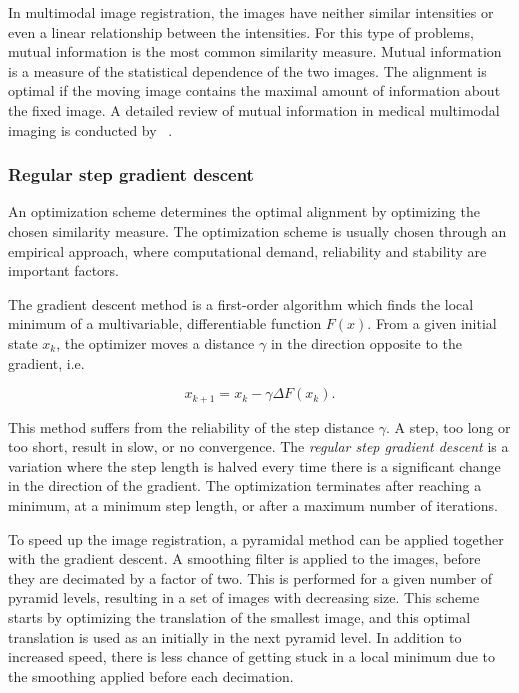 In multimodal image registration, the images have neither similar intensities or even a linear relationship between the intensities. For this type of problems, mutual information is the most common similarity measure. Mutual information is a measure of the statistical dependence of the two images. The alignment is optimal if the moving image contains the maximal amount of information about the fixed image. A detailed review of mutual information in medical multimodal imaging is conducted by ~\citet{563664}.  

\subsubsection{Regular step gradient descent}
An optimization scheme determines the optimal alignment by optimizing the chosen similarity measure. The optimization scheme is usually chosen through an empirical approach, where computational demand, reliability and stability are important factors. 

The gradient descent method is a first-order algorithm which finds the local minimum of a multivariable, differentiable function $F(x)$. From a given initial state $x_k$, the optimizer moves a distance $\gamma$ in the direction opposite to the gradient, i.e.

\begin{equation}
\label{gradient descent}
x_{k+1} = x_k - \gamma \Delta F(x_k).
\end{equation}

This method suffers from the reliability of the step distance $\gamma$. A step, too long or too short, result in slow, or no convergence. The \textit{regular step gradient descent} is a variation where the step length is halved every time there is a significant change in the direction of the gradient. The optimization terminates after reaching a minimum, at a minimum step length, or after a maximum number of iterations.

To speed up the image registration, a pyramidal method can be applied together with the gradient descent. A smoothing filter is applied to the images, before they are decimated by a factor of two. This is performed for a given number of pyramid levels, resulting in a set of images with decreasing size. This scheme starts by optimizing the translation of the smallest image, and this optimal translation is used as an initially in the next pyramid level. In addition to increased speed, there is less chance of getting stuck in a local minimum due to the smoothing applied before each decimation.
 
